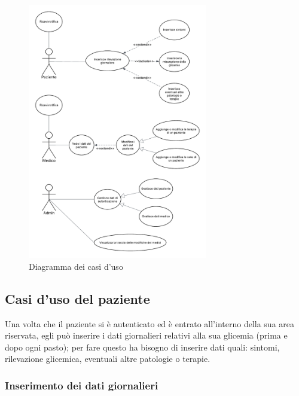\documentclass[a4paper]{article}
\begin{document}
\begin{figure}[H]
	\centering
	\includegraphics[width=0.7\textwidth]{usecase}
	\caption{Diagramma dei casi d'uso}
	\label{fig:usecase}
\end{figure}

\subsection{Casi d'uso del paziente}

Una volta che il paziente si è autenticato ed è entrato all'interno della sua area riservata, egli può
inserire i dati giornalieri relativi alla sua glicemia (prima e dopo ogni pasto); per fare questo
ha bisogno di inserire dati quali: sintomi, rilevazione glicemica, eventuali altre patologie o terapie.

\subsubsection{Inserimento dei dati giornalieri}
\end{document}
